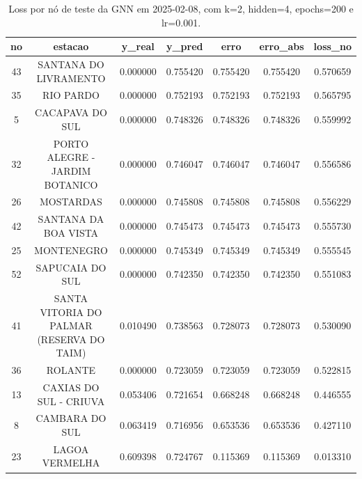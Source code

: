 \begin{table}[h]
\centering
\caption{Loss por nó de teste da GNN em 2025-02-08, com k=2, hidden=4, epochs=200 e lr=0.001.}
\label{tab:gnn_loss_nodes_k2_hidden4}
\begin{tabular}{ccccccc}
\toprule
no & estacao & y\_real & y\_pred & erro & erro\_abs & loss\_no \\
\midrule
43 & SANTANA DO LIVRAMENTO & 0.000000 & 0.755420 & 0.755420 & 0.755420 & 0.570659 \\
35 & RIO PARDO & 0.000000 & 0.752193 & 0.752193 & 0.752193 & 0.565795 \\
5 & CACAPAVA DO SUL & 0.000000 & 0.748326 & 0.748326 & 0.748326 & 0.559992 \\
32 & PORTO ALEGRE - JARDIM BOTANICO & 0.000000 & 0.746047 & 0.746047 & 0.746047 & 0.556586 \\
26 & MOSTARDAS & 0.000000 & 0.745808 & 0.745808 & 0.745808 & 0.556229 \\
42 & SANTANA DA BOA VISTA & 0.000000 & 0.745473 & 0.745473 & 0.745473 & 0.555730 \\
25 & MONTENEGRO & 0.000000 & 0.745349 & 0.745349 & 0.745349 & 0.555545 \\
52 & SAPUCAIA DO SUL & 0.000000 & 0.742350 & 0.742350 & 0.742350 & 0.551083 \\
41 & SANTA VITORIA DO PALMAR (RESERVA DO TAIM) & 0.010490 & 0.738563 & 0.728073 & 0.728073 & 0.530090 \\
36 & ROLANTE & 0.000000 & 0.723059 & 0.723059 & 0.723059 & 0.522815 \\
13 & CAXIAS DO SUL - CRIUVA & 0.053406 & 0.721654 & 0.668248 & 0.668248 & 0.446555 \\
8 & CAMBARA DO SUL & 0.063419 & 0.716956 & 0.653536 & 0.653536 & 0.427110 \\
23 & LAGOA VERMELHA & 0.609398 & 0.724767 & 0.115369 & 0.115369 & 0.013310 \\
\bottomrule
\end{tabular}
\end{table}
